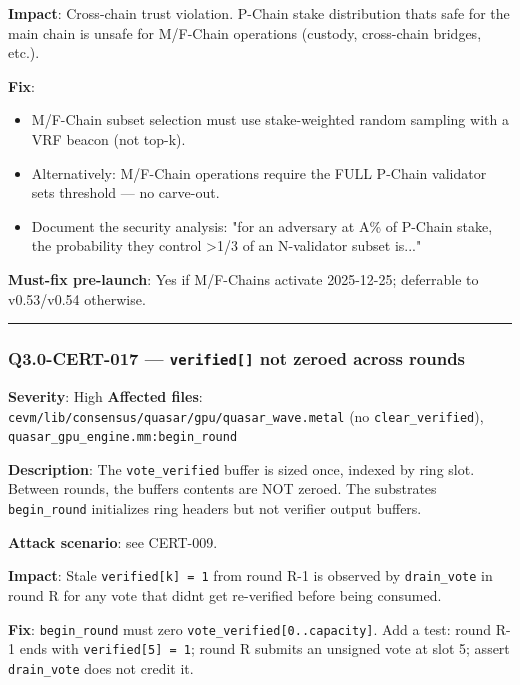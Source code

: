 \documentclass[
]{article}
\providecommand{\tightlist}{%
  \setlength{\itemsep}{0pt}\setlength{\parskip}{0pt}}
\begin{document}
\textbf{Impact}: Cross-chain trust violation. P-Chain stake distribution
that\textquotesingle s safe for the main chain is unsafe for M/F-Chain
operations (custody, cross-chain bridges, etc.).

\textbf{Fix}:

\begin{itemize}
\tightlist
\item
  M/F-Chain subset selection must use stake-weighted random sampling
  with a VRF beacon (not top-k).
\item
  Alternatively: M/F-Chain operations require the FULL P-Chain validator
  set\textquotesingle s threshold --- no carve-out.
\item
  Document the security analysis: "for an adversary at A\% of P-Chain
  stake, the probability they control \textgreater1/3 of an N-validator
  subset is..."
\end{itemize}

\textbf{Must-fix pre-launch}: Yes if M/F-Chains activate 2025-12-25;
deferrable to v0.53/v0.54 otherwise.

\begin{center}\rule{0.5\linewidth}{0.5pt}\end{center}

\subsubsection{\texorpdfstring{Q3.0-CERT-017 --- \texttt{verified{[}{]}}
not zeroed across
rounds}{Q3.0-CERT-017 --- verified{[}{]} not zeroed across rounds}}\label{q30-cert-017--verified-not-zeroed-across-rounds}

\textbf{Severity}: High \textbf{Affected files}:
\texttt{cevm/lib/consensus/quasar/gpu/quasar\_wave.metal} (no
\texttt{clear\_verified}), \texttt{quasar\_gpu\_engine.mm:begin\_round}

\textbf{Description}: The \texttt{vote\_verified} buffer is sized once,
indexed by ring slot. Between rounds, the buffer\textquotesingle s
contents are NOT zeroed. The substrate\textquotesingle s
\texttt{begin\_round} initializes ring headers but not verifier output
buffers.

\textbf{Attack scenario}: see CERT-009.

\textbf{Impact}: Stale \texttt{verified{[}k{]}\ =\ 1} from round R-1 is
observed by \texttt{drain\_vote} in round R for any vote that
didn\textquotesingle t get re-verified before being consumed.

\textbf{Fix}: \texttt{begin\_round} must zero
\texttt{vote\_verified{[}0..capacity{]}}. Add a test: round R-1 ends
with \texttt{verified{[}5{]}\ =\ 1}; round R submits an unsigned vote at
slot 5; assert \texttt{drain\_vote} does not credit it.
\end{document}
